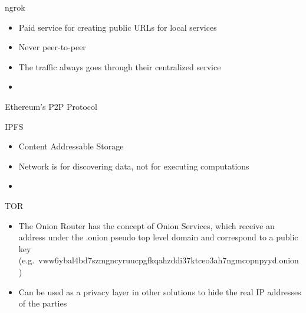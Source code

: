 \label{notes__02100-ngrok.md}
\begin{block}{ngrok}
\label{notes__02100-ngrok.md__ngrok}
\begin{itemize}
\tightlist
\item
  Paid service for creating public URLs for local services
\item
  Never peer-to-peer
\item
  The traffic always goes through their centralized service
\item
\end{itemize}
\end{block}

\label{notes__02110-ethereum.md}
\begin{block}{Ethereum's P2P Protocol}
\label{notes__02110-ethereum.md__ethereums-p2p-protocol}
\end{block}

\label{notes__02120-ipfs.md}
\begin{block}{IPFS}
\label{notes__02120-ipfs.md__ipfs}
\begin{itemize}
\tightlist
\item
  Content Addressable Storage
\item
  Network is for discovering data, not for executing computations
\item
\end{itemize}
\end{block}

\label{notes__02130-tor.md}
\begin{block}{TOR}
\label{notes__02130-tor.md__tor}
\begin{itemize}
\tightlist
\item
  The Onion Router has the concept of Onion Services, which receive an address under the .onion pseudo top level domain and correspond to a public key (e.g.~vww6ybal4bd7szmgncyruucpgfkqahzddi37ktceo3ah7ngmcopnpyyd.onion)
\item
  Can be used as a privacy layer in other solutions to hide the real IP addresses of the parties
\end{itemize}
\end{block}

